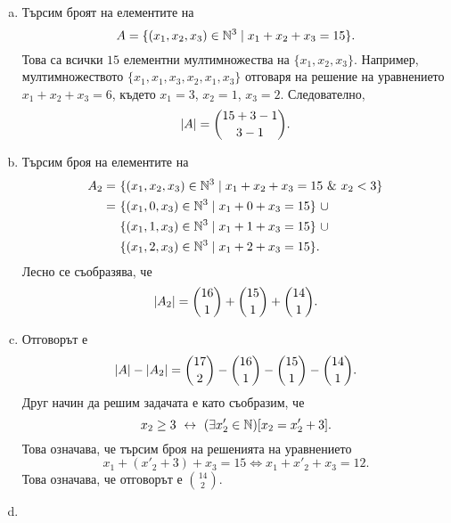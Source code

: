 \begin{hint}
  \begin{enumerate}[a)]
  \item
    Търсим броят на елементите на 
    \[A = \{(x_1,x_2,x_3) \in \mathbb{N}^3\mid x_1 + x_2 + x_3 = 15\}.\]
    Това са всички $15$ елементни мултимножества на  $\{x_1,x_2,x_3\}$.
    Например, мултимножеството $\{x_1,x_1,x_3,x_2,x_1,x_3\}$ отговаря на решение на уравнението $x_1 + x_2 + x_3 = 6$,
    където $x_1 = 3$, $x_2 = 1$, $x_3 = 2$.
    Следователно,
    \[\lvert{A}\rvert = \binom{15 + 3 - 1}{3-1}.\]
  \item
    Търсим броя на елементите на 
    \begin{align*}
      A_2 =\ &\{(x_1,x_2,x_3) \in \Nat^3\mid x_1 + x_2 + x_3 = 15\ \&\ x_2 < 3\}\\
      =\ & \{(x_1,0,x_3) \in \Nat^3\mid x_1 + 0 + x_3 = 15\}\ \cup \\ 
      & \{(x_1,1,x_3) \in \Nat^3\mid x_1 + 1 + x_3 = 15\}\ \cup \\ 
      & \{(x_1,2,x_3) \in \Nat^3\mid x_1 + 2 + x_3 = 15\}.
    \end{align*}
    Лесно се съобразява, че
    \[\lvert{A_2}\rvert = \binom{16}{1} + \binom{15}{1} + \binom{14}{1}.\]
  \item
    Отговорът е
    \[\lvert{A}\rvert - \lvert{A_2}\rvert = \binom{17}{2} - \binom{16}{1} - \binom{15}{1} - \binom{14}{1}.\]
    Друг начин да решим задачата е като съобразим, че 
    \[x_2 \geq 3 \ \leftrightarrow\  (\exists x'_2 \in \mathbb{N})[x_2 = x'_2 + 3].\]
    Това означава, че търсим броя на решенията на уравнението
    \[x_1 + (x'_2 + 3) + x_3 = 15 \iff x_1 + x'_2 + x_3 = 12.\]
    Това означава, че отговорът е $\binom{14}{2}$.
  \item


\end{enumerate}
\end{hint}
